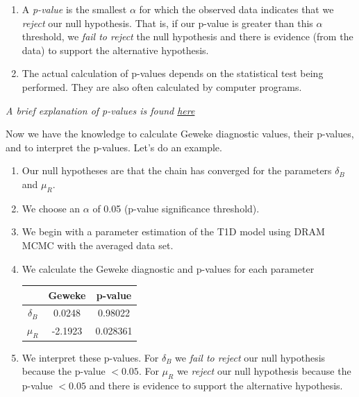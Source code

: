 \begin{appendices}
\begin{tcolorbox}[colback=blue!10,colframe=blue!25!black,title=\textbf{Calculating p-values}]
\begin{enumerate}
    \item A \textit{p-value} is the smallest $\alpha$ for which the observed data indicates that we \textit{reject} our null hypothesis. That is, if our p-value is greater than this $\alpha$ threshold, we \textit{fail to reject} the null hypothesis and there is evidence (from the data) to support the alternative hypothesis.
    \item The actual calculation of p-values depends on the statistical test being performed. They are also often calculated by computer programs.
\end{enumerate}
\textit{A brief explanation of p-values is found \textit{\href{https://www.statsdirect.com/help/basics/p_values.htm}{here}}}
\end{tcolorbox}

\vspace{3mm}
\par Now we have the knowledge to calculate Geweke diagnostic values, their p-values, and to interpret the p-values. Let's do an example.
\begin{tcolorbox}[colback=green!10,colframe=green!25!black,title=\textbf{Calculating and Interpreting Geweke Diagnostic values}]
\begin{enumerate}
    \item Our null hypotheses are that the chain has converged for the parameters $\delta_B$ and $\mu_R$.
    \item We choose an $\alpha$ of 0.05 (p-value significance threshold).
    \item We begin with a parameter estimation of the T1D model using DRAM MCMC with the averaged data set. 
    \item We calculate the Geweke diagnostic and p-values for each parameter
    \begin{table}[H]
        \centering
            \begin{tabular}{c|c c}
               & \textbf{Geweke} & \textbf{p-value}\\
            \hline
            $\delta_B$ & 0.0248 & 0.98022 \\
            $\mu_R$ & -2.1923 & 0.028361
            \end{tabular}
    \end{table}
    \item We interpret these p-values. For $\delta_B$ we \textit{fail to reject} our null hypothesis because the p-value $< 0.05$. For $\mu_R$ we \textit{reject} our null hypothesis because the p-value $< 0.05$ and there is evidence to support the alternative hypothesis.
\end{enumerate}


\end{tcolorbox}
\end{appendices}
